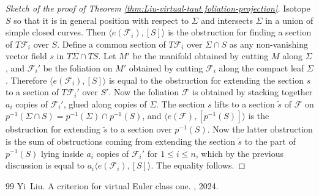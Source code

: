 \documentclass[10pt,a4paper]{amsart}
\begin{document}
\begin{proof}[Sketch of the proof of Theorem \ref{thm:Liu-virtual-taut foliation-projection}]
	Isotope $S$ so that it is in general position with respect to $\Sigma$ and intersects $\Sigma$ in a union of simple closed curves. Then $\langle e(\mathcal{F}_i) , [S] \rangle $ is the obstruction for finding a section of $T \mathcal{F}_i$ over $S$. Define a common section of $T \mathcal{F}_i$ over $\Sigma \cap S$ as any non-vanishing vector field $s$ in $T \Sigma \cap T S$. Let $M'$ be the manifold obtained by cutting $M$ along $\Sigma$, and $\mathcal{F}_i'$ be the foliation on $M'$ obtained by cutting $\mathcal{F}_i$ along the compact leaf $\Sigma$.  Therefore $\langle e(\mathcal{F}_i) , [S] \rangle $ is equal to the obstruction for extending the section $s$ to a section of $T \mathcal{F}_i'$ over $S'$. Now the foliation $\mathcal{F}$ is obtained by stacking together $a_i$ copies of $\mathcal{F}_i'$, glued along copies of $\Sigma$. The section $s$ lifts to a section $\tilde{s}$ of $\mathcal{F}$ on $p^{-1}(\Sigma \cap S) = p^{-1}(\Sigma) \cap p^{-1}(S) $, and $\langle e(\mathcal{F}) , [p^{-1}(S)] \rangle $ is the obstruction for extending $\tilde{s}$ to a section over $p^{-1}(S)$. Now the latter obstruction is the sum of obstructions coming from extending the section $\tilde{s}$ to the part of $p^{-1}(S)$ lying inside $a_i$ copies of $\mathcal{F}_i'$ for $1 \leq i \leq n$, which by the previous discussion is equal to $ a_i \langle e(\mathcal{F}_i) , [S] \rangle $. The equality follows. 

\end{proof}

\begin{thebibliography}{99}
 Yi~Liu. \newblock A criterion for virtual {E}uler class one. , 2024.
\end{thebibliography}
\end{document}
